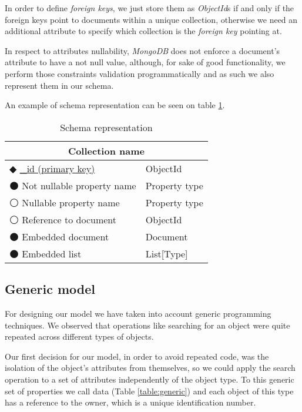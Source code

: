     In order to define \emph{foreign keys}, we just store them as \emph{ObjectId}s if and only if the foreign keys point to documents within a unique collection, otherwise we need an additional attribute to specify which collection is the \emph{foreign key} pointing at.

    In respect to attributes nullability, \emph{MongoDB} does not enforce a document's attribute to have a not null value, although, for sake of good functionality, we perform those constraints validation programmatically and as such we also represent them in our schema.
    
    An example of schema representation can be seen on table \ref{table:schema}.

\begin{table}
\centering
\caption{Schema representation}
\label{table:schema}
    \begin{tabular}{|ll|}
        \hline
        \multicolumn{2}{|c|}{\textbf{Collection name}}            \\ \hline
        $\Diamondblack$ \underline{\_id (primary key)} & ObjectId \\ 
        $\medbullet$ Not nullable property name & Property type   \\ 
        $\medcirc$ Nullable property name       & Property type   \\
        $\medcirc$ Reference to document        & ObjectId        \\
        $\medbullet$ Embedded document          & Document        \\ 
        $\medbullet$ Embedded list              & List[Type]      \\ \hline
    \end{tabular}
\end{table}

\subsection {Generic model}

For designing our model we have taken into account generic programming techniques. We observed that operations like searching for an object were quite repeated across different types of objects. 

Our first decision for our model, in order to avoid repeated code, was the isolation of the object's attributes from themselves, so we could apply the search operation to a set of attributes independently of the object type. To this generic set of properties we call data (Table \ref{table:generic}) and each object of this type has a reference to the owner, which is a unique identification number.

